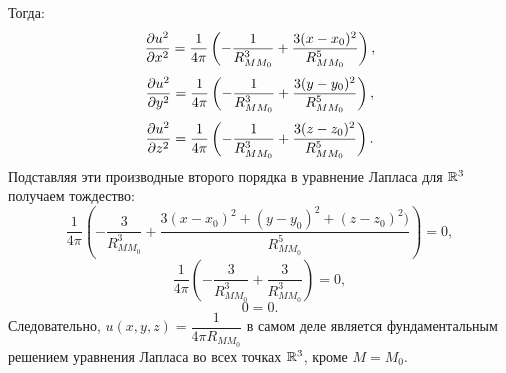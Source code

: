 \documentclass[../main.tex]{subfiles}
\begin{document}
\begin{enumerate}
\[	      \]
	      Тогда:
	      \[
		      \pderivtwo{u}{x}{x} = \dfrac{1}{4\pi} \left(-\dfrac{1}{R_{MM_0}^3} + \dfrac{3(x-x_0)^2}{R_{MM_0}^5}\right),
	      \]
	      \[
		      \pderivtwo{u}{y}{y} = \dfrac{1}{4\pi} \left(-\dfrac{1}{R_{MM_0}^3} + \dfrac{3(y-y_0)^2}{R_{MM_0}^5}\right),
	      \]
	      \[
		      \pderivtwo{u}{z}{z} = \dfrac{1}{4\pi} \left(-\dfrac{1}{R_{MM_0}^3} + \dfrac{3(z-z_0)^2}{R_{MM_0}^5}\right).
	      \]
	      Подставляя эти производные второго порядка в уравнение Лапласа для $\mathbb{R}^3$ получаем тождество:
	      \[
		      \dfrac{1}{4\pi}\left(-\dfrac{3}{R_{MM_0}^3} + \dfrac{3(x-x_0)^2 + (y-y_0)^2 + (z-z_0)^2)}{R_{MM_0}^5}\right) = 0,
	      \]
	      \[
		      \dfrac{1}{4\pi}\left(-\dfrac{3}{R_{MM_0}^3} + \dfrac{3}{R_{MM_0}^3}\right) = 0,
	      \]
	      \[
		      0 = 0.
	      \]
	      Следовательно, $u(x, y, z) = \dfrac{1}{4\pi R_{MM_0}}$ в самом деле является фундаментальным решением уравнения Лапласа во всех точках $\mathbb{R}^3$, кроме $M = M_0$.
\end{enumerate}
\end{document}
